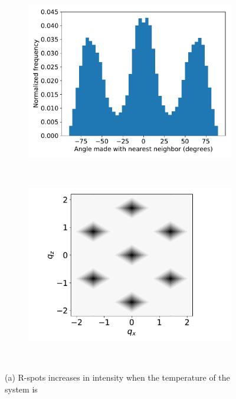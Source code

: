 \documentclass[journal=jpcbfk,manuscript=article]{achemso}
\begin{document}
\begin{figure}[!htb]
\begin{subfigure}[t]{0.32\linewidth}
  \caption{}\label{fig:centroids}
  \end{subfigure}
  \begin{subfigure}[t]{0.32\linewidth}
        \centering
	        \includegraphics[width=\linewidth]{hexagonal_tail_packing.pdf}
	        \caption{}~\label{fig:layered_tails}
  \end{subfigure}
  \begin{subfigure}[t]{0.32\textwidth}
        	\centering
	        \includegraphics[width=\linewidth]{hexagonal_ft.pdf}  %
	        \caption{}~\label{fig:hexagonal_ft}
  \end{subfigure}
  \caption{(a) R-spots increases in intensity when the temperature of the system is 
}
\end{figure}
\end{document}
